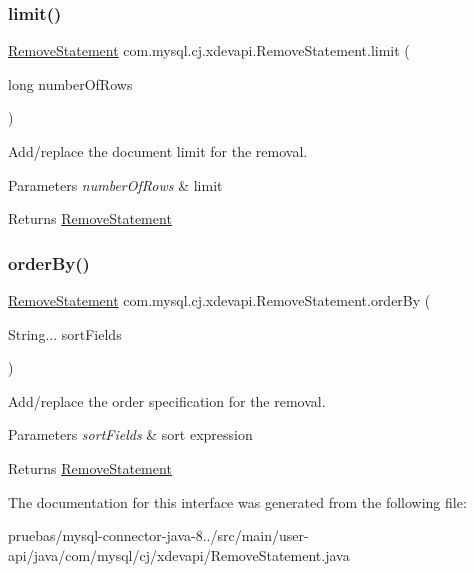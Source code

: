 \subsubsection{\texorpdfstring{limit()}{limit()}}
{\footnotesize\ttfamily \mbox{\hyperlink{interfacecom_1_1mysql_1_1cj_1_1xdevapi_1_1_remove_statement}{Remove\+Statement}} com.\+mysql.\+cj.\+xdevapi.\+Remove\+Statement.\+limit (\begin{DoxyParamCaption}\item[{long}]{number\+Of\+Rows }\end{DoxyParamCaption})}

Add/replace the document limit for the removal.


\begin{DoxyParams}{Parameters}
{\em number\+Of\+Rows} & limit \\
\hline
\end{DoxyParams}
\begin{DoxyReturn}{Returns}
\mbox{\hyperlink{interfacecom_1_1mysql_1_1cj_1_1xdevapi_1_1_remove_statement}{Remove\+Statement}} 
\end{DoxyReturn}
\mbox{\label{interfacecom_1_1mysql_1_1cj_1_1xdevapi_1_1_remove_statement_a98adae04f69c2128a44d1c766f00a5f2}} 
\subsubsection{\texorpdfstring{order\+By()}{orderBy()}}
{\footnotesize\ttfamily \mbox{\hyperlink{interfacecom_1_1mysql_1_1cj_1_1xdevapi_1_1_remove_statement}{Remove\+Statement}} com.\+mysql.\+cj.\+xdevapi.\+Remove\+Statement.\+order\+By (\begin{DoxyParamCaption}\item[{String...}]{sort\+Fields }\end{DoxyParamCaption})}

Add/replace the order specification for the removal.


\begin{DoxyParams}{Parameters}
{\em sort\+Fields} & sort expression \\
\hline
\end{DoxyParams}
\begin{DoxyReturn}{Returns}
\mbox{\hyperlink{interfacecom_1_1mysql_1_1cj_1_1xdevapi_1_1_remove_statement}{Remove\+Statement}} 
\end{DoxyReturn}


The documentation for this interface was generated from the following file\+:\begin{DoxyCompactItemize}
\item 
pruebas/mysql-\/connector-\/java-\/8../src/main/user-\/api/java/com/mysql/cj/xdevapi/Remove\+Statement.\+java\end{DoxyCompactItemize}
